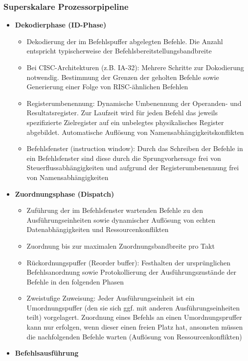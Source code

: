 \subsubsection{Superskalare Prozessorpipeline}
\begin{itemize}
	\item \textbf{Dekodierphase (ID-Phase)}
	\begin{itemize}
		\item Dekodierung der im Befehlspuffer abgelegten Befehle. Die Anzahl entspricht typischerweise der Befehlsbereitstellungsbandbreite
		\item Bei CISC-Architekturen (z.B. IA-32): Mehrere Schritte zur Dokodierung notwendig. Bestimmung der Grenzen der geholten Befehle sowie Generierung einer Folge von RISC-ähnlichen Befehlen %
		\item Registerumbenennung: Dynamische Umbenennung der Operanden- und Resultatsregister. Zur Laufzeit wird für jeden Befehl das jeweils spezifizierte Zielregister auf ein unbelegtes physikalisches Register abgebildet. Automatische Auflösung von Namensabhängigkeitskonflikten
		\item Befehlsfenster (instruction window): Durch das Schreiben der Befehle in ein Befehlsfenster sind diese durch die Sprungvorhersage frei von Steuerflussabhängigkeiten und aufgrund der Registerumbenennung frei von Namensabhängigkeiten
	\end{itemize}
	\item \textbf{Zuordnungsphase (Dispatch)}
	\begin{itemize}
		\item Zuführung der im Befehlsfenster wartenden Befehle zu den Ausführungseinheiten sowie dynamischer Auflösung von echten Datenabhängigkeiten und Ressourcenkonflikten
		\item Zuordnung bis zur maximalen Zuordnungsbandbreite pro Takt
		\item Rückordnungspuffer (Reorder buffer): Festhalten der ursprünglichen Befehlsanordnung sowie Protokollierung der Ausführungszustände der Befehle in den folgenden Phasen
		\item Zweistufige Zuweisung: Jeder Ausführungseinheit ist ein Umordnungspuffer (den sie sich ggf. mit anderen Ausführungseinheiten teilt) vorgelagert. Zuordnung eines Befehls an einen Umordnungspruffer kann nur erfolgen, wenn dieser einen freien Platz hat, ansonsten müssen die nachfolgenden Befehle warten (Auflösung von Ressourcenkonflikten)
	\end{itemize}
	\item \textbf{Befehlsausführung}

\end{itemize}
